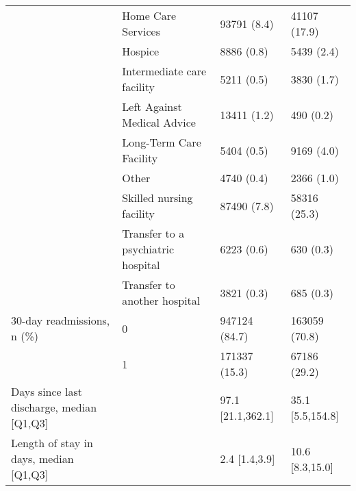 \begin{tabular}{llll}
                                       & Home Care Services &                           93791 (8.4) &      41107 (17.9) \\
                                       & Hospice &                            8886 (0.8) &        5439 (2.4) \\
                                       & Intermediate care facility &                            5211 (0.5) &        3830 (1.7) \\
                                       & Left Against Medical Advice &                           13411 (1.2) &         490 (0.2) \\
                                       & Long-Term Care Facility &                            5404 (0.5) &        9169 (4.0) \\
                                       & Other &                            4740 (0.4) &        2366 (1.0) \\
                                       & Skilled nursing facility &                           87490 (7.8) &      58316 (25.3) \\
                                       & Transfer to a psychiatric hospital &                            6223 (0.6) &         630 (0.3) \\
                                       & Transfer to another hospital &                            3821 (0.3) &         685 (0.3) \\
30-day readmissions, n (\%) & 0 &                         947124 (84.7) &     163059 (70.8) \\
                                       & 1 &                         171337 (15.3) &      67186 (29.2) \\
Days since last discharge, median [Q1,Q3] &   &                     97.1 [21.1,362.1] &  35.1 [5.5,154.8] \\
Length of stay in days, median [Q1,Q3] &   &                         2.4 [1.4,3.9] &   10.6 [8.3,15.0] \\
\bottomrule
\end{tabular}
